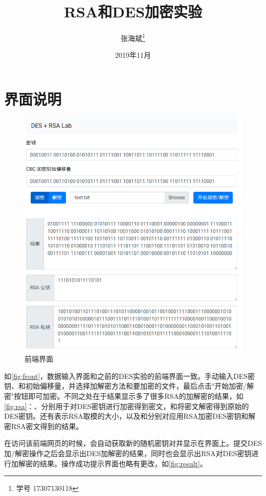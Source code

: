 \documentclass[12pt,a4paper]{article}
\title{RSA和DES加密实验}
\author{张海斌\thanks{学号 17307130118}}
\date{2019年11月}
\begin{document}
\maketitle

\renewcommand\contentsname{目~录} %
\tableofcontents

\section{界面说明}

\begin{figure}[htbp]
	\centering
	\includegraphics[width=\textwidth]{front}
	\caption{前端界面}
	\label{fig:front}
\end{figure}

如\autoref{fig:front}，数据输入界面和之前的DES实验的前端界面一致。手动输入DES密钥、和初始偏移量，并选择加解密方法和要加密的文件，最后点击"开始加密/解密"按钮即可加密。不同之处在于结果显示多了很多RSA的加解密的结果，如\autoref{fig:rsa}：、分别用于对DES密钥进行加密得到密文，和将密文解密得到原始的DES密钥。还有表示RSA取模的大小，以及和分别对应用RSA加密DES密钥和解密RSA密文得到的结果。

在访问该前端网页的时候，会自动获取新的随机密钥对并显示在界面上。提交DES加/解密操作之后会显示出DES加解密的结果，同时也会显示出RSA对DES密钥进行加解密的结果。操作成功提示界面也略有更改，如\autoref{fig:result}。
\end{document}
